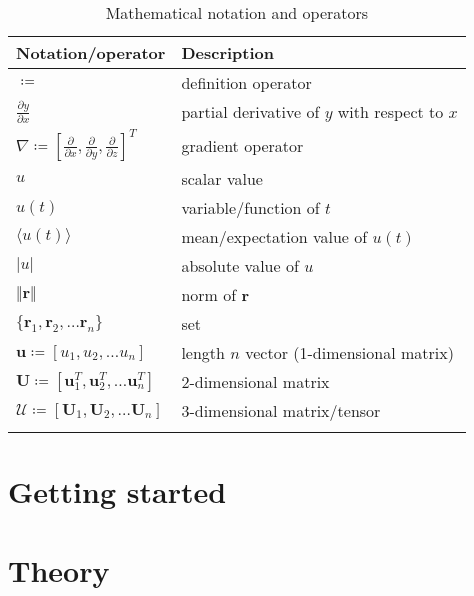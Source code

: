 \documentclass[prodtf]{EngC}
\numberwithin{equation}{chapter}
\numberwithin{figure}{chapter}
\numberwithin{table}{chapter}
\begin{document}
\begin{table}[!htb]
\caption{Mathematical notation and operators}
\label{tab:math}
\begin{tabular}{|l|l|}
\hline
Notation/operator & Description \\
\hline
$\coloneq$											& definition operator \\
$\frac{\partial y}{\partial x}$ 					& partial derivative of $y$ with respect to $x$ \\ 
$\nabla \coloneq [ \frac{\partial}{\partial x}, \frac{\partial}{\partial y}, \frac{\partial}{\partial z} ]^T $  & gradient operator \\
$u$ 												& scalar value \\
$u(t)$												& variable/function of $t$ \\
$\langle u(t) \rangle $ 							& mean/expectation value of $u(t)$  \\
$\vert u \vert$										& absolute value of $u$ \\
$\Vert \mathbf{r} \Vert$							& norm of $\mathbf{r}$ \\
$\{ \mathbf{r}_1, \mathbf{r}_2, \ldots \mathbf{r}_n \}$	& set \\
$\mathbf{u} \coloneq [u_1, u_2, \ldots u_n]$ 		& length $n$ vector (1-dimensional matrix) \\
$\mathbf{U} \coloneq [\mathbf{u}_1^T, \mathbf{u}_2^T, \ldots \mathbf{u}_n^T]$ 		& 2-dimensional matrix \\
$\mathcal{U} \coloneq [\mathbf{U}_1, \mathbf{U}_2, \ldots \mathbf{U}_n]$ & 3-dimensional matrix/tensor \\
 & \\
\hline
\end{tabular}
\end{table}






\mainmatter

\part{Getting started}



\part{Theory}





\end{document}
